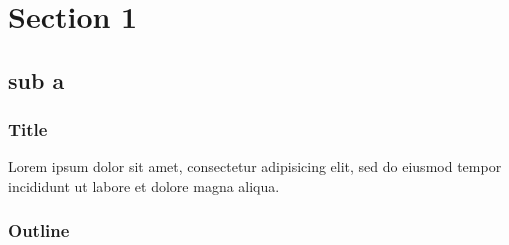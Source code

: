 \begin{frame}
\titlepage{}
\end{frame}

\section{Section 1}
\subsection{sub a}

\begin{frame}
\frametitle{Title}
Lorem ipsum dolor sit amet, consectetur adipisicing elit, sed do eiusmod tempor incididunt ut labore et dolore magna aliqua.
\end{frame}

\begin{frame}
\frametitle{Outline}
\tableofcontents
\end{frame}
